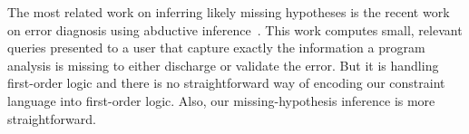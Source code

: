 The most related work on inferring likely missing hypotheses is the recent work
on error diagnosis using abductive inference~\cite{dillig:pldi12}. This work
computes small, relevant queries presented to a user that capture exactly the
information a program analysis is missing to either discharge or validate the
error. But it is handling first-order logic and there is no straightforward way
of encoding our constraint language into first-order logic. Also, our
missing-hypothesis inference is more straightforward.






